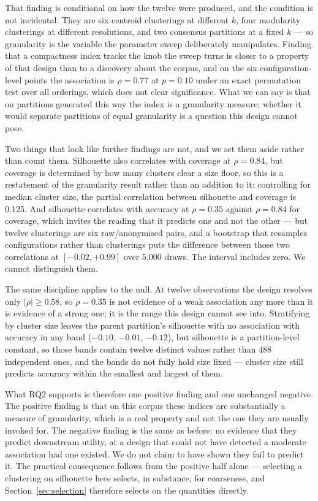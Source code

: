 That finding is conditional on how the twelve were produced, and the condition is not incidental.
They are six centroid clusterings at different $k$, four modularity clusterings at different
resolutions, and two consensus partitions at a fixed $k$ --- so granularity is the variable the
parameter sweep deliberately manipulates. Finding that a compactness index tracks the knob the
sweep turns is closer to a property of that design than to a discovery about the corpus, and on
the six configuration-level points the association is $\rho = 0.77$ at $p = 0.10$ under an exact
permutation test over all orderings, which does not clear significance. What we can say is that on partitions generated this
way the index is a granularity measure; whether it would separate partitions of equal
granularity is a question this design cannot pose.

Two things that look like further findings are not, and we set them aside rather than count
them. Silhouette also correlates with coverage at $\rho = 0.84$, but coverage is determined by
how many clusters clear a size floor, so this is a restatement of the granularity result rather
than an addition to it: controlling for median cluster size, the partial correlation between
silhouette and coverage is 0.125. And silhouette correlates with accuracy at
$\rho = 0.35$ against $\rho = 0.84$ for coverage, which invites the reading that it predicts one
and not the other --- but twelve clusterings are six raw/anonymised pairs, and a bootstrap that
resamples configurations rather than clusterings puts the difference between those two
correlations at $[-0.02, +0.99]$ over 5{,}000 draws. The interval includes zero. We cannot distinguish them.

The same discipline applies to the null. At twelve observations the design resolves only
$|\rho| \geq 0.58$, so $\rho = 0.35$ is not evidence of a weak association any more than it is
evidence of a strong one; it is the range this design cannot see into. Stratifying by cluster
size leaves the parent partition's silhouette with no association with accuracy in any band
($-0.10$, $-0.01$, $-0.12$), but silhouette is a partition-level constant, so those bands
contain twelve distinct values rather than 488 independent ones, and the bands do not fully hold
size fixed --- cluster size still predicts accuracy within the smallest and largest of them.

What RQ2 supports is therefore one positive finding and one unchanged negative. The positive
finding is that on this corpus these indices are substantially a measure of granularity, which
is a real property and not the one they are usually invoked for. The negative finding is the
same as before: no evidence that they predict downstream utility, at a design that could not
have detected a moderate association had one existed. We do not claim to have shown they fail to
predict it. The practical consequence follows from the positive half alone --- selecting a
clustering on silhouette here selects, in substance, for coarseness, and
Section~\ref{sec:selection} therefore selects on the quantities directly.

